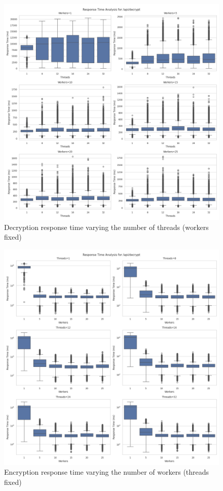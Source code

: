 \documentclass[cic,tc,english]{iiufrgs}
\begin{document}
        \begin{figure}
            \centering
            \includegraphics[width=\textwidth]{images/phase1/api_decrypt/response_time_workers_summary.png}
            \caption{Decryption response time varying the number of threads (workers fixed)}
            \label{fig:decrypt_response_time_workers}
        \end{figure}

        \begin{figure}
            \centering
            \includegraphics[width=\textwidth]{images/phase1/api_decrypt/response_time_threads_summary.png}
            \caption{Encryption response time varying the number of workers (threads fixed)}
            \label{fig:encrypt_response_time_threads}
        \end{figure}
\end{document}
